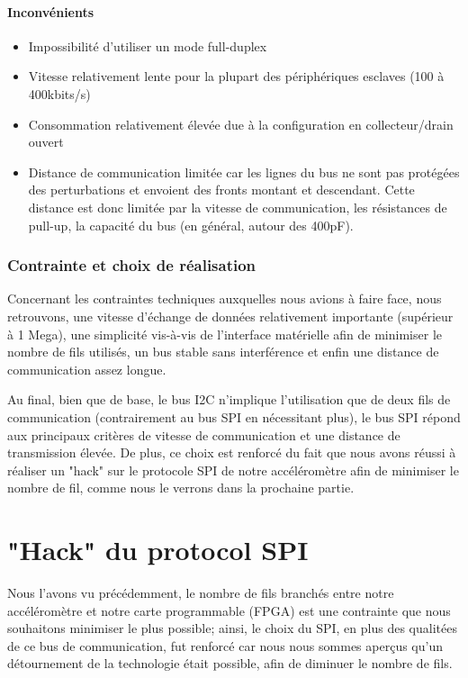 \documentclass[french,a4paper,12pt]{report}
\begin{document}
  		\subsubsection{Inconvénients}
			\begin{itemize}
			\item Impossibilité d’utiliser un mode full-duplex 
			\item Vitesse relativement lente pour la plupart des périphériques esclaves (100 à 400kbits/s) 
			\item Consommation relativement élevée due à la configuration en collecteur/drain ouvert 
			\item Distance de communication limitée car les lignes du bus ne sont pas protégées des perturbations et envoient des fronts montant et descendant. Cette distance est donc limitée par la vitesse de communication, les résistances de pull-up, la capacité du bus (en général, autour des 400pF).
\end{itemize}
 
 \subsection{Contrainte et choix de réalisation}
Concernant les contraintes techniques auxquelles nous avions à faire face, nous retrouvons, une vitesse d'échange de données relativement importante (supérieur à 1 Mega), une simplicité vis-à-vis de l'interface matérielle afin de minimiser le nombre de fils utilisés, un bus stable sans interférence et enfin une distance de communication assez longue.

Au final, bien que de base, le bus I2C n'implique l'utilisation que de deux fils de communication (contrairement au bus SPI en nécessitant plus), le bus SPI répond aux principaux critères de vitesse de communication et une distance de transmission élevée. De plus, ce choix est renforcé du fait que nous avons réussi à réaliser un "hack" sur le protocole SPI de notre accéléromètre afin de minimiser le nombre de fil, comme nous le verrons dans la prochaine partie.


\chapter{"Hack" du protocol SPI}
	Nous l'avons vu précédemment, le nombre de fils branchés entre notre accéléromètre et notre carte programmable (FPGA) est une contrainte que nous souhaitons minimiser le plus possible; ainsi, le choix du SPI, en plus des qualitées de ce bus de communication, fut renforcé car nous nous sommes aperçus qu'un détournement de la technologie était possible, afin de diminuer le nombre de fils.
	
\end{document}
